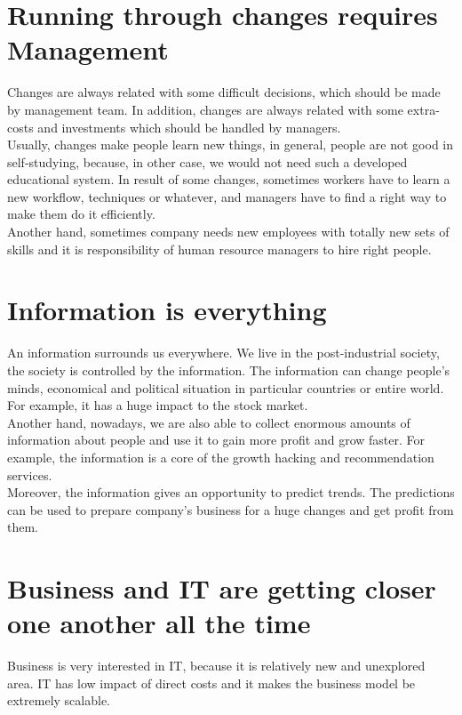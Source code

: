 \documentclass[english]{article}
\begin{document}
\section{Running through changes requires Management}

Changes are always related with some difficult decisions, which should be made by management team. In addition, changes are always related with some extra-costs and investments which should be handled by managers.\\

Usually, changes make people learn new things, in general, people are not good in self-studying, because, in other case, we would not need such a developed educational system. In result of some changes, sometimes workers have to learn a new workflow, techniques or whatever, and managers have to find a right way to make them do it efficiently. \\

Another hand, sometimes company needs new employees with totally new sets of skills and it is responsibility of human resource managers to hire right people.

\section{Information is everything} 

An information surrounds us everywhere. We live in the post-industrial society, the society is controlled by the information. The information can change people's minds, economical and political situation in particular countries or entire world. For example, it has a huge impact to the stock market. \\

Another hand, nowadays, we are also able to collect enormous amounts of information about people and use it to gain more profit and grow faster. For example, the information is a core of the growth hacking and recommendation services. \\

Moreover, the information gives an opportunity to predict trends. The predictions can be used to prepare company's business for a huge changes and get profit from them.

\section{Business and IT are getting closer one another all the time}
Business is very interested in IT, because it is relatively new and unexplored area. IT has low impact of direct costs and it makes the business model be extremely scalable.\\
\end{document}
